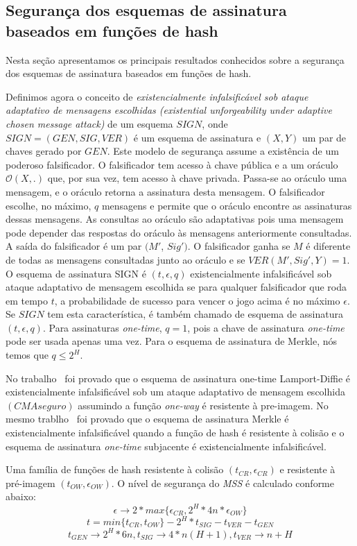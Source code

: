 \documentclass{SBCbookchapter}
\begin{document}
\begin{otherlanguage}{brazilian}
\subsection{Segurança dos esquemas de assinatura baseados em funções de hash}
Nesta seção apresentamos os principais resultados conhecidos sobre a segurança dos esquemas de assinatura baseados em funções de hash.

Definimos agora o conceito de \emph{existencialmente infalsificável sob ataque adaptativo de mensagens escolhidas (existential unforgeability under adaptive chosen message attack)} de um esquema $SIGN$, onde $SIGN = (GEN, SIG, VER)$ é um esquema de assinatura e $(X, Y)$ um par de chaves gerado por $GEN$. 
Este modelo de segurança assume a existência de um poderoso falsificador. 
O falsificador tem acesso à chave pública e a um oráculo $\mathcal{O}(X, .)$ que, por sua vez, tem acesso à chave privada. 
Passa-se ao oráculo uma mensagem, e o oráculo retorna a assinatura desta mensagem. O falsificador escolhe, no máximo, $q$ mensagens  e permite que o oráculo encontre as assinaturas dessas mensagens. 
As consultas ao oráculo são adaptativas pois uma mensagem pode depender das respostas do oráculo às mensagens anteriormente consultadas. 
A saída do falsificador é um par $(M'$, $Sig')$. 
O falsificador ganha se $M$ é diferente de todas as mensagens consultadas junto ao oráculo e se $VER(M',Sig', Y) = 1$.
O esquema de assinatura SIGN é $(t, \epsilon, q)$ existencialmente infalsificável sob ataque adaptativo de mensagem escolhida se para qualquer falsificador que roda em tempo $t$, a probabilidade de sucesso para vencer o jogo acima é no máximo $\epsilon$.
Se $SIGN$ tem esta característica, é também chamado de esquema de assinatura $(t, \epsilon, q)$.
Para assinaturas \textit{one-time}, $q = 1$, pois a chave de assinatura \textit{one-time} pode ser usada apenas uma vez. 
Para o esquema de assinatura de Merkle, nós temos que $q \leqslant 2^H$.

No trabalho~\cite{bernst:09} foi provado que o esquema de assinatura one-time Lamport-Diffie é existencialmente infalsificável sob um ataque adaptativo de mensagem escolhida $(CMA seguro)$ assumindo a função \textit{one-way} é resistente à pre-imagem.
No mesmo trablho~\cite{bernst:09} foi provado que o esquema de assinatura Merkle é existencialmente infalsificável  quando a função de hash é resistente à colisão e o esquema de assinatura \textit{one-time} subjacente é existencialmente infalsificável.

Uma família de funções de hash resistente à colisão $(t_{CR}, \epsilon_{CR})$ e resistente à pré-imagem $(t_{OW}, \epsilon_{OW})$. 
O nível de segurança do \textit{MSS} é calculado conforme abaixo: 
$$\epsilon \rightarrow 2 * max\{\epsilon_{CR},2^H * 4n * \epsilon_{OW}\}$$
$$t = min\{t_{CR},t_{OW}\} - 2^H * t_{SIG} - t_{VER} - t_{GEN}$$
$$t_{GEN} \rightarrow 2^H * 6n, t_{SIG} \rightarrow 4*n(H+1), t_{VER} \rightarrow n+H$$


\end{otherlanguage}
\end{document}
